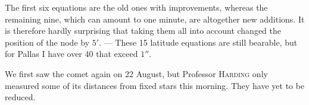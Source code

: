 \par\indent The first six equations are the old ones with improvements, whereas the remaining nine, which can amount to one minute, are altogether new additions. It is therefore hardly surprising that taking them all into account changed the position of the node by $5'$. — These 15 latitude equations are still bearable, but for Pallas I have over 40 that exceed $1''$.\par
\indent We first saw the comet again on 22 August, but Professor \textsc{Harding} only measured some of its distances from fixed stars this morning. They have yet to be reduced.
